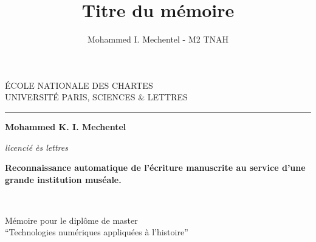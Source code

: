 \documentclass[a4paper,12pt,twoside]{book}
\author{Mohammed I. Mechentel - M2 TNAH}
\title{Titre du mémoire}
\begin{document}
	\begin{titlepage}
		\begin{center}
			
			\bigskip
			
			\begin{large}				
				ÉCOLE NATIONALE DES CHARTES\\
				UNIVERSITÉ PARIS, SCIENCES \& LETTRES
			\end{large}
			\begin{center}\rule{2cm}{0.02cm}\end{center}
			
			\bigskip
			\bigskip
			\bigskip
			\begin{Large}
				\textbf{Mohammed K. I. Mechentel}\\
			\end{Large}
			\begin{normalsize} \textit{licencié ès lettres}\\
			\end{normalsize}
			
			\bigskip
			\bigskip
			\bigskip
			
			\begin{Huge}
				\textbf{Reconnaissance automatique de l'écriture manuscrite au service d'une grande institution muséale.}\\
			\end{Huge}
			\bigskip
			\bigskip
			\begin{LARGE}
				\textbf{}\\
			\end{LARGE}
			
			\bigskip
			\bigskip
			\bigskip
			\begin{large}
			\end{large}
			\vfill
			
			\begin{large}
				Mémoire 
				pour le diplôme de master \\
				\enquote{Technologies numériques appliquées à l'histoire} \\
			\end{large}
			
		\end{center}
	\end{titlepage}
	
	\thispagestyle{empty}	
	\cleardoublepage
	
	\frontmatter
	
\end{document}
